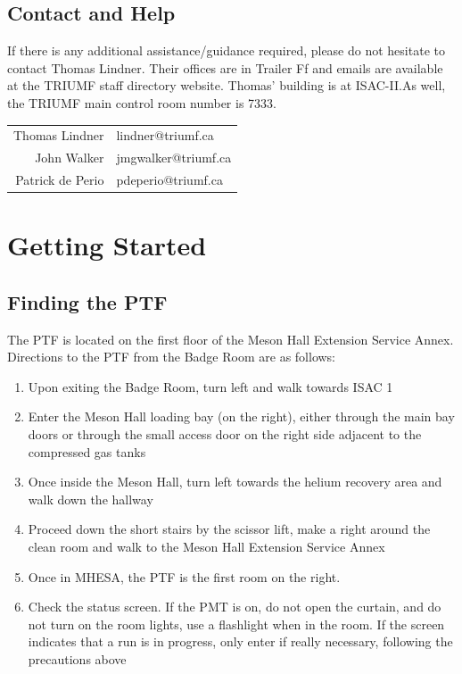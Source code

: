 \documentclass[twoside,letterpaper]{refart}
\begin{document}
\subsection{Contact and Help}

If there is any additional assistance/guidance required, please do not hesitate to contact Thomas Lindner. Their offices are in Trailer Ff and emails are available at the TRIUMF staff directory website. Thomas' building is at ISAC-II.\@ As well, the TRIUMF main control room number is 7333.

\begin{center}\begin{tabular}{rl}
	Thomas Lindner & lindner@triumf.ca \\
	John Walker    & jmgwalker@triumf.ca \\
	Patrick de Perio     & pdeperio@triumf.ca
\end{tabular}\end{center}

\newpage

\section{Getting Started}

\subsection{Finding the PTF}

The PTF is located on the first floor of the Meson Hall Extension Service Annex. Directions to the PTF from the Badge Room are as follows:

\begin{enumerate}
	\item Upon exiting the Badge Room, turn left and walk towards ISAC 1
	\item Enter the Meson Hall loading bay (on the right), either through the main bay doors or through the small access door on the right side adjacent to the compressed gas tanks
	\item Once inside the Meson Hall, turn left towards the helium recovery area and walk down the hallway
	\item Proceed down the short stairs by the scissor lift, make a right around the clean room and walk to the Meson Hall Extension Service Annex 
	\item Once in MHESA, the PTF is the first room on the right.
	\item Check the status screen. If the PMT is on, do not open the curtain, and do not turn on the room lights, use a flashlight when in the room. If the screen indicates that a run is in progress, only enter if really necessary, following the precautions above
\end{enumerate}
\end{document}
